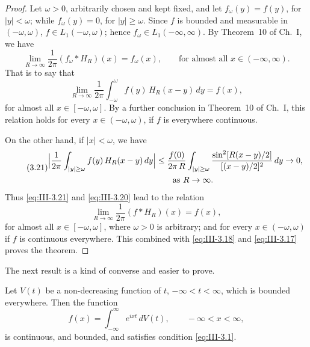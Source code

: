 \begin{proof}
Let $\omega>0$, arbitrarily chosen and kept fixed, and let $f_{\omega}(y)=f(y)$, for $|y|<\omega$; while $f_{\omega}(y)=0$, for $|y|\ge\omega$. Since $f$ is bounded and measurable in $(-\omega,\omega)$, $f\in L_{1}(-\omega,\omega)$; hence $f_{\omega}\in L_{1}(-\infty,\infty)$. By Theorem~10 of Ch.~I, we have
\[
\lim_{R\to\infty}\frac{1}{2\pi}(f_{\omega}*H_{R})(x)=f_{\omega}(x),\qquad\text{for almost all }x\in(-\infty,\infty).
\]
That is to say that
\begin{equation}\tag{3.20}\label{eq:III-3.20}
\lim_{R\to\infty}\frac{1}{2\pi}\int_{-\omega}^{\omega}f(y)\,H_{R}(x-y)\,dy=f(x),
\end{equation}
for almost all $x\in[-\omega,\omega]$. By a further conclusion in Theorem~10 of Ch.~I, this relation holds for every $x\in(-\omega,\omega)$, if $f$ is everywhere continuous.

On the other hand, if $|x|<\omega$, we have
\begin{equation}\tag{3.21}\label{eq:III-3.21}
\begin{aligned}
\Bigl|\frac{1}{2\pi}\int_{|y|\ge\omega}f(y)\,H_{R}(x-y)\,dy\Bigr|
&\le\frac{f(0)}{2\pi\,R}\int_{|y|\ge\omega}\frac{\sin^{2}[R(x-y)/2]}{[(x-y)/2]^{2}}\,dy\to0,\\
&\qquad\text{as }R\to\infty.
\end{aligned}
\end{equation}
Thus \eqref{eq:III-3.21} and \eqref{eq:III-3.20} lead to the relation
\begin{equation}\tag{3.19}\label{eq:III-3.19b}
\lim_{R\to\infty}\frac{1}{2\pi}(f*H_{R})(x)=f(x),
\end{equation}
for almost all $x\in[-\omega,\omega]$, where $\omega>0$ is arbitrary; and for every $x\in(-\omega,\omega)$ if $f$ is continuous everywhere. This combined with \eqref{eq:III-3.18} and \eqref{eq:III-3.17} proves the theorem.
\end{proof}

The next result is a kind of converse and easier to prove.

\begin{theorem}[Bochner]\label{thm:III-6}
Let $V(t)$ be a non-decreasing function of $t$, $-\infty<t<\infty$, which is bounded everywhere. Then the function
\begin{equation}\tag{3.22}\label{eq:III-3.22}
f(x)=\int_{-\infty}^{\infty}e^{ixt}\,dV(t),\qquad-\infty<x<\infty,
\end{equation}
is continuous, and bounded, and satisfies condition \eqref{eq:III-3.1}.
\end{theorem}

